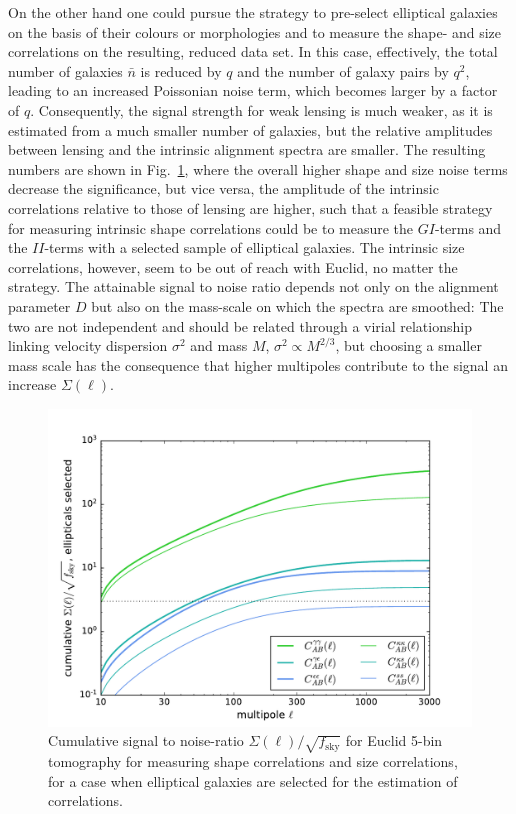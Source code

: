 \documentclass[a4paper,fleqn,usenatbib]{mnras}
\begin{document}
On the other hand one could pursue the strategy to pre-select elliptical galaxies on the basis of their colours or morphologies and to measure the shape- and size correlations on the resulting, reduced data set. In this case, effectively, the total number of galaxies $\bar{n}$ is reduced by $q$ and the number of galaxy pairs by $q^2$, leading to an increased Poissonian noise term, which becomes larger by a factor of $q$. Consequently, the signal strength for weak lensing is much weaker, as it is estimated from a much smaller number of galaxies, but the relative amplitudes between lensing and the intrinsic alignment spectra are smaller. The resulting numbers are shown in Fig.~\ref{fig:s2n_elliptical}, where the overall higher shape and size noise terms decrease the significance, but vice versa, the amplitude of the intrinsic correlations relative to those of lensing are higher, such that a feasible strategy for measuring intrinsic shape correlations could be to measure the $GI$-terms and the $II$-terms with a selected sample of elliptical galaxies. The intrinsic size correlations, however, seem to be out of reach with Euclid, no matter the strategy. The attainable signal to noise ratio depends not only on the alignment parameter $D$ but also on the mass-scale on which the spectra are smoothed: The two are not independent and should be related through a virial relationship linking velocity dispersion $\sigma^2$ and mass $M$, $\sigma^2 \propto M^{2/3}$, but choosing a smaller mass scale has the consequence that higher multipoles contribute to the signal an increase $\Sigma(\ell)$.

\begin{figure}
\centering
\includegraphics[scale=0.45]{./figures/sigma_elliptical.pdf}
\caption{Cumulative signal to noise-ratio $\Sigma(\ell)/\sqrt{f_\mathrm{sky}}$ for Euclid 5-bin tomography for measuring shape correlations and size correlations, for a case when elliptical galaxies are selected for the estimation of correlations.}
\label{fig:s2n_elliptical}
\end{figure}
\end{document}
